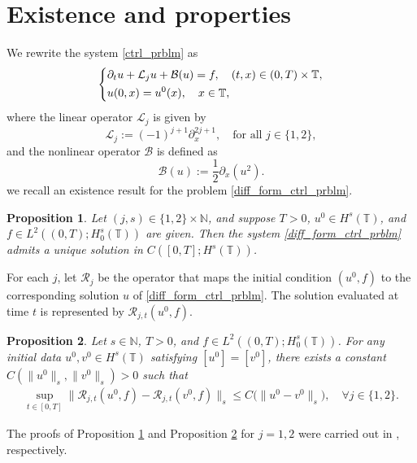\documentclass[10pt, reqno]{amsart}
\newtheorem{proposition}{Proposition} [section]
\numberwithin{equation}{section}
\begin{document}
\section{Existence and properties}\label{sec_2}
We rewrite the system \eqref{ctrl_prblm} as  
\begin{align}\label{diff_form_ctrl_prblm}  
	\begin{dcases}  
		\partial_t u + \mathcal{L}_j u + \mathcal{B}(u) = f, \quad (t, x) \in (0, T) \times \mathbb{T}, \\  
		u(0, x) = u^0 (x), \quad x \in \mathbb{T},  
	\end{dcases}  
\end{align}  
where the linear operator $\mathcal{L}_j$ is given by  
\[
\mathcal{L}_j := (-1)^{j + 1} \partial_x^{2j + 1}, \quad \text{for all } j \in \{1, 2\},  
\]  
and the nonlinear operator $\mathcal{B}$ is defined as  
\[
\mathcal{B}(u) := \frac{1}{2} \partial_x(u^2).  
\]
we recall an existence result for the problem \eqref{diff_form_ctrl_prblm}.
\begin{proposition}\label{prp_existence}
	Let $(j, s) \in \{1, 2\} \times \mathbb{N}$, and suppose $T > 0$, \( u^0 \in H^s(\mathbb{T}) \), and \( f \in L^2((0, T); H^s_0(\mathbb{T})) \) are given. Then the system \eqref{diff_form_ctrl_prblm} admits a unique solution in \( C([0, T]; H^s(\mathbb{T})) \).  
\end{proposition}
For each \( j \), let \( \mathcal{R}_j \) be the operator that maps the initial condition \( (u^0, f) \) to the corresponding solution \( u \) of \eqref{diff_form_ctrl_prblm}. The solution evaluated at time \( t \) is represented by \( \mathcal{R}_{j, t}(u^0, f) \).
\begin{proposition}\label{prp_stability}  
	Let \( s \in \mathbb{N} \), \( T > 0 \), and \( f \in L^2((0, T); H^s_0(\mathbb{T})) \). For any initial data \( u^0, v^0 \in H^s(\mathbb{T}) \) satisfying \( [u^0] = [v^0] \), there exists a constant \( C(\|u^0\|_s, \|v^0\|_s) > 0 \) such that  
	\begin{align}\label{stability}  
		\sup_{t \in [0, T]} \|\mathcal{R}_{j, t}(u^0, f) - \mathcal{R}_{j, t}(v^0, f)\|_s \leq C \Big(\|u^0 - v^0\|_s \Big), \quad \forall j \in \{1, 2\}.  
	\end{align}  
\end{proposition}
The proofs of Proposition \ref{prp_existence} and Proposition \ref{prp_stability} for \( j = 1,2 \) were carried out in \cite{Chen23,Ahamed_Mondal_25}, respectively.
\end{document}
